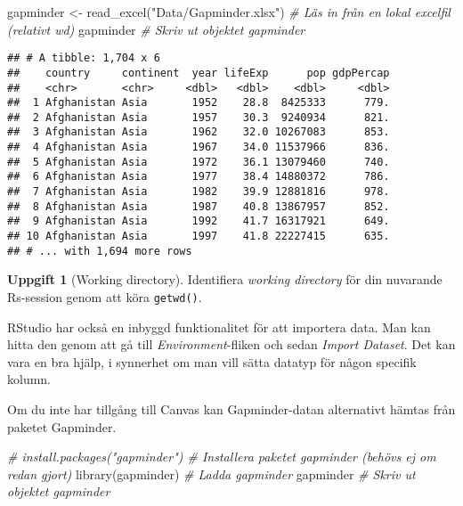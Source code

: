 \documentclass[
]{book}
\newenvironment{Shaded}{\begin{snugshade}}{\end{snugshade}}
\newcommand{\CommentTok}[1]{\textcolor[rgb]{0.56,0.35,0.01}{\textit{#1}}}
\newcommand{\FunctionTok}[1]{\textcolor[rgb]{0.00,0.00,0.00}{#1}}
\newcommand{\NormalTok}[1]{#1}
\newcommand{\OtherTok}[1]{\textcolor[rgb]{0.56,0.35,0.01}{#1}}
\newcommand{\StringTok}[1]{\textcolor[rgb]{0.31,0.60,0.02}{#1}}
\theoremstyle{definition}
\theoremstyle{definition}
\theoremstyle{definition}
\newtheorem{exercise}{Uppgift}[chapter]
\theoremstyle{definition}
\theoremstyle{remark}
\begin{document}
\begin{Shaded}
\begin{Highlighting}[]
\NormalTok{gapminder }\OtherTok{\textless{}{-}} \FunctionTok{read\_excel}\NormalTok{(}\StringTok{"Data/Gapminder.xlsx"}\NormalTok{)             }\CommentTok{\# Läs in från en lokal excelfil (relativt wd)}
\NormalTok{gapminder                                                  }\CommentTok{\# Skriv ut objektet gapminder}
\end{Highlighting}
\end{Shaded}

\begin{verbatim}
## # A tibble: 1,704 x 6
##    country     continent  year lifeExp      pop gdpPercap
##    <chr>       <chr>     <dbl>   <dbl>    <dbl>     <dbl>
##  1 Afghanistan Asia       1952    28.8  8425333      779.
##  2 Afghanistan Asia       1957    30.3  9240934      821.
##  3 Afghanistan Asia       1962    32.0 10267083      853.
##  4 Afghanistan Asia       1967    34.0 11537966      836.
##  5 Afghanistan Asia       1972    36.1 13079460      740.
##  6 Afghanistan Asia       1977    38.4 14880372      786.
##  7 Afghanistan Asia       1982    39.9 12881816      978.
##  8 Afghanistan Asia       1987    40.8 13867957      852.
##  9 Afghanistan Asia       1992    41.7 16317921      649.
## 10 Afghanistan Asia       1997    41.8 22227415      635.
## # ... with 1,694 more rows
\end{verbatim}

\begin{exercise}[Working directory]
Identifiera \emph{working directory} för din nuvarande Rs-session genom att köra \texttt{getwd()}.
\end{exercise}

RStudio har också en inbyggd funktionalitet för att importera data. Man kan hitta den genom att gå till \emph{Environment}-fliken och sedan \emph{Import Dataset}. Det kan vara en bra hjälp, i synnerhet om man vill sätta datatyp för någon specifik kolumn.

Om du inte har tillgång till Canvas kan Gapminder-datan alternativt hämtas från paketet Gapminder.

\begin{Shaded}
\begin{Highlighting}[]
\CommentTok{\# install.packages("gapminder")        \# Installera paketet gapminder (behövs ej om redan gjort)}
\FunctionTok{library}\NormalTok{(gapminder)                     }\CommentTok{\# Ladda gapminder}
\NormalTok{gapminder                              }\CommentTok{\# Skriv ut objektet gapminder}
\end{Highlighting}
\end{Shaded}
\end{document}

